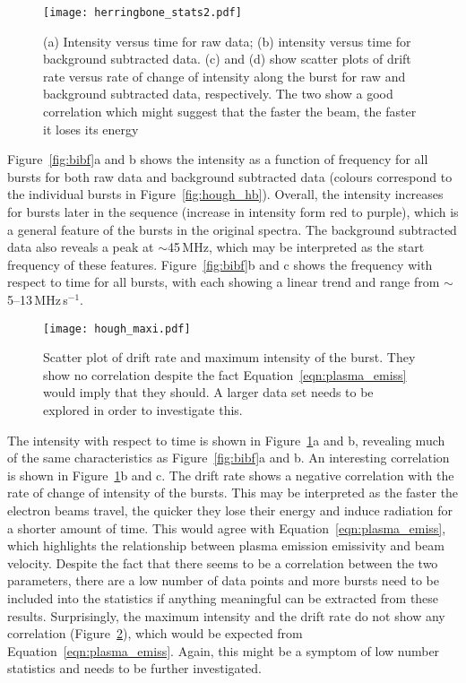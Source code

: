 %
%
\begin{figure}[t!]
\begin{center}
\texttt{[image: herringbone\_stats2.pdf]}
\caption[Herringbone statistics 2]{(a) Intensity versus time for raw data; (b) intensity versus time for background subtracted data. (c) and (d) show scatter plots of drift rate versus rate of change of intensity along the burst for raw and background subtracted data, respectively.  The two show a good correlation which might suggest that the faster the beam, the faster it loses its energy}
\label{fig:bibt}
\end{center}
\end{figure}
Figure~\ref{fig:bibf}a and b shows the intensity as a function of frequency for all bursts for both raw data and background subtracted data (colours correspond to the individual bursts in Figure~\ref{fig:hough_hb}). Overall, the intensity increases for bursts later in the sequence (increase in intensity form red to purple), which is a general feature of the bursts in the original spectra. The background subtracted data also reveals a peak at $\sim$45\,MHz, which may be interpreted as the start frequency of these features.
Figure~\ref{fig:bibf}b and c shows the frequency with respect to time for all bursts, with each showing a linear trend and range from $\sim$5--13\,MHz\,s$^{-1}$.
\begin{figure}[t!]
\begin{center}
\texttt{[image: hough\_maxi.pdf]}
\caption[Herringbone intensity vs drift]{Scatter plot of drift rate and maximum intensity of the burst. They show no correlation despite the fact Equation~\ref{eqn:plasma_emiss} would imply that they should. A larger data set needs to be explored in order to investigate this.}
\label{fig:maxi}
\end{center}
\end{figure}
The intensity with respect to time is shown in Figure~\ref{fig:bibt}a and b, revealing much of the same characteristics as Figure~\ref{fig:bibf}a and b. An interesting correlation is shown in Figure~\ref{fig:bibt}b and c. The drift rate shows a negative correlation with the rate of change of intensity of the bursts. This may be interpreted as the faster the electron beams travel, the quicker they lose their energy and induce radiation for a shorter amount of time. This would agree with Equation~\ref{eqn:plasma_emiss}, which highlights the relationship between plasma emission emissivity and beam velocity.  Despite the fact that there seems to be a correlation between the two parameters, there are a low number of data points and more bursts need to be included into the statistics if anything meaningful can be extracted from these results. Surprisingly, the maximum intensity and the drift rate do not show any correlation (Figure~\ref{fig:maxi}), which would be expected from Equation~\ref{eqn:plasma_emiss}. Again, this might be a symptom of low number statistics and needs to be further investigated.
%
%


